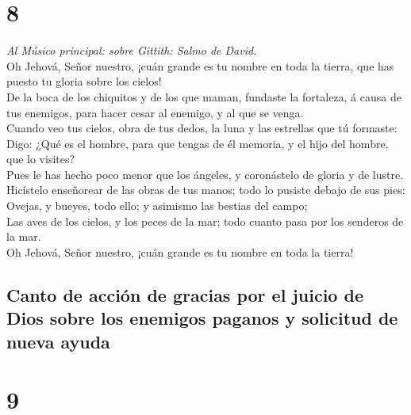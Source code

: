 \hypertarget{section-7}{%
\section{8}\label{section-7}}

 \emph{Al Músico principal: sobre Gittith: Salmo de
David.}\\
Oh Jehová, Señor nuestro, ¡cuán grande es tu nombre en toda la tierra,
que has puesto tu gloria sobre los cielos!\\
 De la boca de los chiquitos y de los que maman, fundaste la
fortaleza, á causa de tus enemigos, para hacer cesar al enemigo, y al
que se venga.\\
 Cuando veo tus cielos, obra de tus dedos, la luna y las
estrellas que tú formaste:\\
 Digo: ¿Qué es el hombre, para que tengas de él memoria, y
el hijo del hombre, que lo visites?\\
 Pues le has hecho poco menor que los ángeles, y coronástelo
de gloria y de lustre.\\
 Hicístelo enseñorear de las obras de tus manos; todo lo
pusiste debajo de sus pies:\\
 Ovejas, y bueyes, todo ello; y asimismo las bestias del
campo;\\
 Las aves de los cielos, y los peces de la mar; todo cuanto
pasa por los senderos de la mar.\\
 Oh Jehová, Señor nuestro, ¡cuán grande es tu nombre en toda
la tierra!

\hypertarget{canto-de-acciuxf3n-de-gracias-por-el-juicio-de-dios-sobre-los-enemigos-paganos-y-solicitud-de-nueva-ayuda}{%
\subsection{Canto de acción de gracias por el juicio de Dios sobre los
enemigos paganos y solicitud de nueva
ayuda}\label{canto-de-acciuxf3n-de-gracias-por-el-juicio-de-dios-sobre-los-enemigos-paganos-y-solicitud-de-nueva-ayuda}}

\hypertarget{section-8}{%
\section{9}\label{section-8}}

